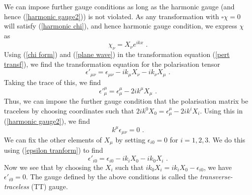 \documentclass[11pt]{cuthesis}
\newcommand{\mn}{_{\mu\nu}}
\newcommand{\fs}{\text{ .}}
\begin{document}
We can impose further gauge conditions as long as the harmonic gauge (and hence (\ref{harmonic gauge2})) is not violated. As any transformation with $\square \chi = 0$ will satisfy (\ref{harmonic chi}), and hence harmonic gauge condition, we express $\chi$ as 
\begin{equation} \label{chi form}
\chi_\nu = X_\nu e^{ikx} \fs
\end{equation}
Using (\ref{chi form}) and (\ref{plane wave}) in the transformation equation (\ref{pert transf}), we find the transformation equation for the polarisation tensor
\begin{equation} \label{epsilon tranform}
\epsilon'\mn = \epsilon\mn -ik_\mu X_\nu - ik_\nu X_\mu \fs
\end{equation}
Taking the trace of this, we find
\begin{equation}
\epsilon'^\mu_\mu = \epsilon^\mu_\mu - 2ik^\mu X_\mu \fs
\end{equation}
Thus, we can impose the further gauge condition that the polarisation matrix be traceless by choosing coordinates such that $2ik^0 X_0 = \epsilon^\mu_\mu - 2ik^i X_i$. Using this in (\ref{harmonic gauge2}), we find
\begin{equation} \label{harmonic gauge 3}
k^\mu \epsilon\mn = 0 \fs
\end{equation}
We can fix the other elements of $X_\mu$ by setting $\epsilon_{i 0} = 0$ for $i=1,2,3$. We do this using (\ref{epsilon tranform}) to find
\begin{equation} \label{epsilon 0}
\epsilon'_{i 0} = \epsilon_{i 0} -ik_i X_0 - ik_0 X_i \fs
\end{equation}
Now we see that by choosing the $X_i$ such that $ ik_0 X_i = ik_i X_0 - \epsilon_{i 0}$, we have $\epsilon'_{i 0} = 0$. The gauge defined by the above conditions is called the \textit{transverse-traceless} (TT) gauge.

\end{document}
